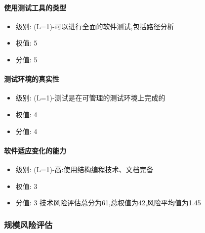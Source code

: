 \documentclass[hyperref, a4paper]{ctexart}
\providecommand{\tightlist}{%
  \setlength{\itemsep}{0pt}\setlength{\parskip}{0pt}}
\let\oldparagraph\paragraph
\renewcommand{\paragraph}[1]{\oldparagraph{#1}\mbox{}}
\begin{document}
\hypertarget{ux4f7fux7528ux6d4bux8bd5ux5de5ux5177ux7684ux7c7bux578b}{%
\paragraph{使用测试工具的类型}\label{ux4f7fux7528ux6d4bux8bd5ux5de5ux5177ux7684ux7c7bux578b}}

\begin{itemize}
\tightlist
\item
  级别: (L=1)-可以进行全面的软件测试,包括路径分析
\item
  权值: 5
\item
  分值: 5
\end{itemize}

\hypertarget{ux6d4bux8bd5ux73afux5883ux7684ux771fux5b9eux6027}{%
\paragraph{测试环境的真实性}\label{ux6d4bux8bd5ux73afux5883ux7684ux771fux5b9eux6027}}

\begin{itemize}
\tightlist
\item
  级别: (L=1)-测试是在可管理的测试环境上完成的
\item
  权值: 4
\item
  分值: 4
\end{itemize}

\hypertarget{ux8f6fux4ef6ux9002ux5e94ux53d8ux5316ux7684ux80fdux529b}{%
\paragraph{软件适应变化的能力}\label{ux8f6fux4ef6ux9002ux5e94ux53d8ux5316ux7684ux80fdux529b}}

\begin{itemize}
\tightlist
\item
  级别: (L=1)-高:使用结构编程技术、文档完备
\item
  权值: 3
\item
  分值: 3 \newline 技术风险评估总分为61,总权值为42,风险平均值为1.45
\end{itemize}

\hypertarget{ux89c4ux6a21ux98ceux9669ux8bc4ux4f30}{%
\subsubsection{规模风险评估}\label{ux89c4ux6a21ux98ceux9669ux8bc4ux4f30}}
\end{document}

